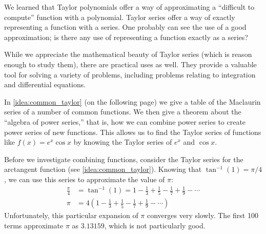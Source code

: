 We learned that Taylor polynomials offer a way of approximating a ``difficult to compute'' function with a polynomial. Taylor series offer a way of exactly representing a function with a series. One probably can see the use of a good approximation; is there any use of representing a function exactly as a series?

While we appreciate the mathematical beauty of Taylor series (which is reason enough to study them), there are practical uses as well. They provide a valuable tool for solving a variety of problems, including problems relating to integration and differential equations.

In \autoref{idea:common_taylor} (on the following page) we give  a table of the Maclaurin series of a number of common functions. We then give a theorem about the ``algebra of power series,'' that is, how we can combine power series to create power series of new functions. This allows us to find the Taylor series of functions like $f(x) = e^x\cos x$ by knowing the Taylor series of $e^x$ and $\cos x$.

Before we investigate combining functions, consider the Taylor series for the arctangent function (see \autoref{idea:common_taylor}). Knowing that $\tan^{-1}(1) = \pi/4$, we can use this series to approximate the value of $\pi$:
\begin{align*}
\frac{\pi}4 &= \tan^{-1}(1) = 1-\frac13+\frac15-\frac17+\frac19-\dotsb\\
\pi &= 4\left(1-\frac13+\frac15-\frac17+\frac19-\dotsb\right)
\end{align*} 
Unfortunately, this particular expansion of $\pi$ converges very slowly. The first 
100 terms approximate $\pi$ as $3.13159$, which is not particularly good.

\clearpage

